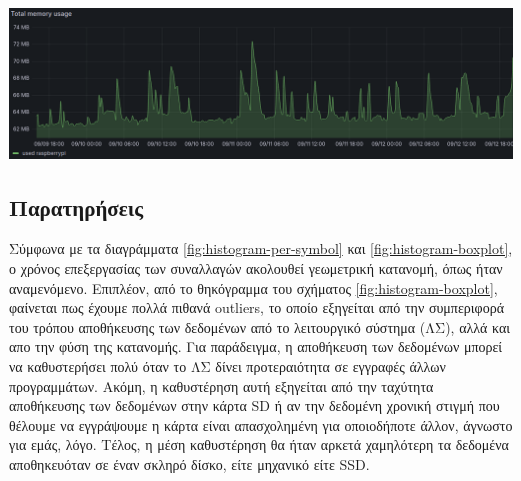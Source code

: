 \documentclass[11pt]{article}
\begin{document}
\begin{center}
\includegraphics[width=0.7\linewidth]{./images/memory-usage.png}
\end{center}
\subsection{Παρατηρήσεις}
\label{sec:org58a605c}
Σύμφωνα με τα διαγράμματα \ref{fig:histogram-per-symbol} και \ref{fig:histogram-boxplot}, ο χρόνος επεξεργασίας των συναλλαγών ακολουθεί γεωμετρική κατανομή, όπως ήταν αναμενόμενο. Επιπλέον, από το θηκόγραμμα του σχήματος \ref{fig:histogram-boxplot}, φαίνεται πως έχουμε πολλά πιθανά outliers, το οποίο εξηγείται από την συμπεριφορά του τρόπου αποθήκευσης των δεδομένων από το λειτουργικό σύστημα (ΛΣ), αλλά και απο την φύση της κατανομής. Για παράδειγμα, η αποθήκευση των δεδομένων μπορεί να καθυστερήσει πολύ όταν το ΛΣ δίνει προτεραιότητα σε εγγραφές άλλων προγραμμάτων. Ακόμη, η καθυστέρηση αυτή εξηγείται από την ταχύτητα αποθήκευσης των δεδομένων στην κάρτα SD ή αν την δεδομένη χρονική στιγμή που θέλουμε να εγγράψουμε η κάρτα είναι απασχολημένη για οποιοδήποτε άλλον, άγνωστο για εμάς, λόγο. Τέλος, η μέση καθυστέρηση θα ήταν αρκετά χαμηλότερη τα δεδομένα αποθηκευόταν σε έναν σκληρό δίσκο, είτε μηχανικό είτε SSD.

\printbibliography[heading=bibnumbered]
\end{document}
